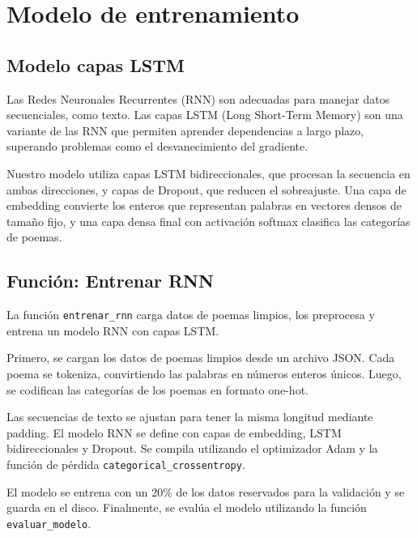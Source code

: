 \section{Modelo de entrenamiento}

\subsection{Modelo capas LSTM}
Las Redes Neuronales Recurrentes (RNN) son adecuadas para manejar datos secuenciales, como texto. Las capas LSTM (Long Short-Term Memory) son una variante de las RNN que permiten aprender dependencias a largo plazo, superando problemas como el desvanecimiento del gradiente.

Nuestro modelo utiliza capas LSTM bidireccionales, que procesan la secuencia en ambas direcciones, y capas de Dropout, que reducen el sobreajuste. Una capa de embedding convierte los enteros que representan palabras en vectores densos de tamaño fijo, y una capa densa final con activación softmax clasifica las categorías de poemas.

\subsection{Función: Entrenar RNN}
La función \texttt{entrenar\_rnn} carga datos de poemas limpios, los preprocesa y entrena un modelo RNN con capas LSTM.

Primero, se cargan los datos de poemas limpios desde un archivo JSON. Cada poema se tokeniza, convirtiendo las palabras en números enteros únicos. Luego, se codifican las categorías de los poemas en formato one-hot.

Las secuencias de texto se ajustan para tener la misma longitud mediante padding. El modelo RNN se define con capas de embedding, LSTM bidireccionales y Dropout. Se compila utilizando el optimizador Adam y la función de pérdida \texttt{categorical\_crossentropy}.

El modelo se entrena con un 20\% de los datos reservados para la validación y se guarda en el disco. Finalmente, se evalúa el modelo utilizando la función \texttt{evaluar\_modelo}.

